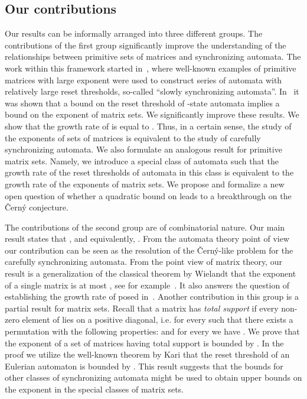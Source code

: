 \documentclass[a4paper,USenglish]{lipics}
\theoremstyle{definition}
\begin{document}
\subsection{Our contributions}
Our results can be informally arranged into three different groups. The contributions of the first group significantly improve the understanding of the relationships between primitive sets of matrices and synchronizing automata. The work within this framework started in~\cite{AGV2013}, where well-known examples of primitive matrices with large exponent were used to construct series of automata with relatively large reset thresholds, so-called ``slowly synchronizing automata''. In~\cite{BJO15} it was shown that a  bound on the reset threshold of -state automata implies a  bound on the exponent of  matrix sets. We significantly improve these results. We show that the growth rate of  is equal to . Thus, in a certain sense, the study of the exponents of sets of matrices is equivalent to the study of carefully synchronizing automata. We also formulate an analogous result for primitive  matrix sets. Namely, we introduce a special class of automata  such that the growth rate of the reset thresholds of automata in this class is equivalent to the growth rate of the exponents of  matrix sets. We propose and formalize a new open question of whether a quadratic bound on  leads to a breakthrough on the \v{C}ern\'{y} conjecture.

The contributions of the second group are of combinatorial nature. Our main result states that , and equivalently, . From the automata theory point of view our contribution can be seen as the resolution of the \v{C}ern\'{y}-like problem for the carefully synchronizing automata. From the point view of matrix theory, our result is a generalization of the classical theorem by Wielandt that the exponent of a single matrix is at most , see for example~\cite[Corollary 8.5.9]{HoJo}. It also answers the question of establishing the growth rate of  posed in~\cite{BJO15}. Another contribution in this group is a partial result for  matrix sets. Recall that a matrix  has \emph{total support} if every non-zero element  of  lies on a positive diagonal, i.e. for every  such that  there exists a permutation  with the following properties:  and for every  we have . We prove that the exponent of a set of matrices having total support is bounded by . In the proof we  utilize the well-known theorem by Kari that the reset threshold of an Eulerian automaton is bounded by . This result suggests that the bounds for other classes of synchronizing automata might be used to obtain upper bounds on the exponent in the special classes of  matrix sets.
\end{document}
